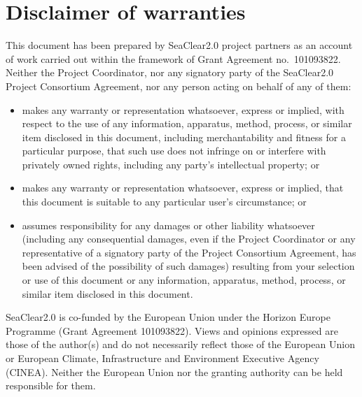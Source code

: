 \documentclass[a4paper,11pt]{article}
\let\oldsection\section
\renewcommand\section{\clearpage\oldsection}
\begin{document}
\section*{Disclaimer of warranties}

This document has been prepared by SeaClear2.0 project partners as an account of work carried out within the framework of Grant Agreement no.~101093822.
Neither the Project Coordinator, nor any signatory party of the SeaClear2.0 Project Consortium Agreement, nor any person acting on behalf of any of them:
\begin{itemize}
\item makes any warranty or representation whatsoever, express or implied, with respect to the use of any information, apparatus, method, process, or similar item disclosed in this document, including merchantability and fitness for a particular purpose, that such use does not infringe on or interfere with privately owned rights, including any party's intellectual property; or
\item makes any warranty or representation whatsoever, express or implied, that this document is suitable to any particular user's circumstance; or
\item assumes responsibility for any damages or other liability whatsoever (including any consequential damages, even if the Project Coordinator or any representative of a signatory party of the Project Consortium Agreement, has been advised of the possibility of such damages) resulting from your selection or use of this document or any information, apparatus, method, process, or similar item disclosed in this document.
\end{itemize}

SeaClear2.0 is co-funded by the European Union under the Horizon Europe Programme (Grant Agreement 101093822). Views and opinions expressed are those of the author(s) and do not necessarily reflect those of the European Union or European Climate, Infrastructure and Environment Executive Agency (CINEA). Neither the European Union nor the granting authority can be held responsible for them.


\pagebreak
\end{document}
